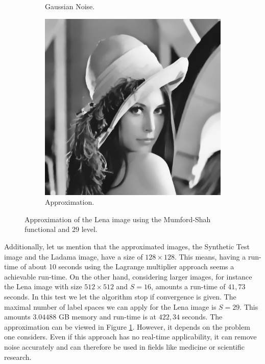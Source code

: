 \documentclass[abstracton]{scrreprt}
\begin{document}
\begin{figure}[!ht]
\begin{subfigure}[b]{0.3\textwidth}
                    \caption{Gaussian Noise.}
                \end{subfigure}
                \begin{subfigure}[b]{0.3\textwidth}
                    \includegraphics[width=\textwidth]{img/lagrange/lena_25level.png}
                    \caption{Approximation.}
                \end{subfigure}
                \caption[Mumford-Shah approximation of Lena using 29 level.]{Approximation of the Lena image using the Mumford-Shah functional and 29 level.}
            \label{fig:lena_ms}
            \end{figure}
            Additionally, let us mention that the approximated images, the Synthetic Test image and the Ladama image, have a size of $128 \times 128$. This means, having a run-time of about 10 seconds using the Lagrange multiplier approach seems a achievable run-time. On the other hand, considering larger images, for instance the Lena image with size $512 \times 512$ and $S = 16$, amounts a run-time of $41,73$ seconds. In this test we let the algorithm stop if convergence is given. The maximal number of label spaces we can apply for the Lena image is $S = 29$. This amounts $3.04488$ GB memory and run-time is at $422,34$ seconds. The approximation can be viewed in Figure \ref{fig:lena_ms}. However, it depends on the problem one considers. Even if this approach has no real-time applicability, it can remove noise accurately and can therefore be used in fields like medicine or scientific research.
\end{document}

